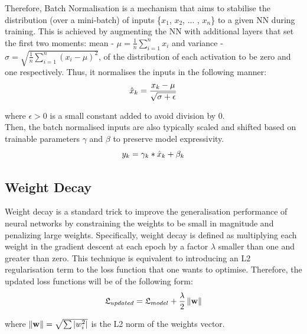 Therefore, Batch Normalisation is a mechanism that aims to stabilise the distribution (over a mini-batch) of inputs \{$x_1$, $x_2$, ... , $x_n$\} to a given NN during training. This is achieved by augmenting the NN with additional layers that set the first two moments: mean - $\mu = \frac{1}{n} \sum_{i=1}^n x_i$ and variance - $\sigma = \sqrt{\frac{1}{n} \sum_{i=1}^n (x_i - \mu) ^ 2}$, of the distribution of each activation to be zero and one respectively. Thus, it normalises the inputs in the following manner: \\

\begin{equation}
  \centering
  \hat{x}_k = \frac{x_k - \mu}{\sqrt{\sigma + \epsilon}}
\end{equation}

where $\epsilon > 0$ is a small constant added to avoid division by 0. \\

Then, the batch normalised inputs are also typically scaled and shifted based on trainable parameters $\gamma$ and $\beta$ to preserve model expressivity. \\

\begin{equation}
  \centering
  y_k = \gamma_k * \hat{x}_k + \beta_k
\end{equation}

\subsection{Weight Decay}
Weight decay is a standard trick to improve the generalisation performance of neural
networks by constraining the weights to be small in magnitude and penalizing large weights. Specifically, weight decay is defined as multiplying each weight in the gradient descent at each epoch by a factor $\lambda$ smaller than one and greater than zero. This technique is equivalent to introducing an L2 regularisation term to the loss function that one wants to optimise. Therefore, the updated loss functions will be of the following form: \\

\begin{equation}
  \centering
  \mathfrak{L}_{updated} = \mathfrak{L}_{model} + \frac{\lambda}{2} \norm{\textbf{w}}
\end{equation}

where $\left\lVert\textbf{w}\right\rVert = \sqrt{\sum |w_i^2|}$ is the L2 norm of the weights vector.\\

